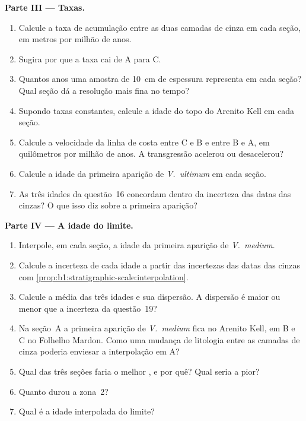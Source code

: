\begin{problem}
\noindent\textbf{Parte III --- Taxas.}
\begin{enumerate}[resume]
  \item Calcule a taxa de acumulação entre as duas camadas de cinza em cada seção, em metros por
        milhão de anos.
  \item Sugira por que a taxa cai de A para C.
  \item Quantos anos uma amostra de \qty{10}{cm} de espessura representa em cada seção? Qual seção
        dá a resolução mais fina no tempo?
  \item Supondo taxas constantes, calcule a idade do topo do Arenito Kell em cada seção.
  \item Calcule a velocidade da linha de costa entre C e B e entre B e A, em quilômetros por
        milhão de anos. A transgressão acelerou ou desacelerou?
  \item Calcule a idade da primeira aparição de \emph{V.~ultimum} em cada seção.
  \item As três idades da questão~16 concordam dentro da incerteza das datas das cinzas? O que
        isso diz sobre a primeira aparição?
\end{enumerate}

\noindent\textbf{Parte IV --- A idade do limite.}
\begin{enumerate}[resume]
  \item Interpole, em cada seção, a idade da primeira aparição de \emph{V.~medium}.
  \item Calcule a incerteza de cada idade a partir das incertezas das datas das cinzas com
        \cref{prop:b1:stratigraphic-scale:interpolation}.
  \item Calcule a média das três idades e sua dispersão. A dispersão é maior ou menor que a
        incerteza da questão~19?
  \item Na seção~A a primeira aparição de \emph{V.~medium} fica no Arenito Kell, em B e C no
        Folhelho Mardon. Como uma mudança de litologia entre as camadas de cinza poderia enviesar a
        interpolação em A?
  \item Qual das três seções faria o melhor , e por quê? Qual seria a pior?
  \item Quanto durou a zona~2?
  \item Qual é a idade interpolada do limite?
\end{enumerate}
\end{problem}
